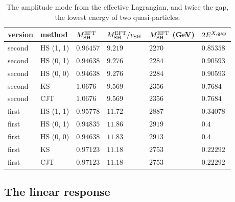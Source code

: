 \documentclass[aps,prd,onecolumn,superscriptaddress,nofootinbib,floatfix,longbibliography]{revtex4-2}
\begin{document}
\begin{table}[!htbp]
\caption{\label{tab:amp}The amplitude mode from the effective Lagrangian, and twice the gap, the lowest energy of two quasi-particles.}
\begingroup\centering\footnotesize\setlength{\tabcolsep}{4pt}
\begin{tabular}{llllll}
\hline\hline
version & method & $M^{\rm EFT}_{\rm SH}$ & $M^{\rm EFT}_{\rm SH}/v_{\rm SH}$ & $M^{\rm EFT}_{\rm SH}$ (GeV) & $2E^{X,{\rm gap}}$ \\ \hline
second & HS (1, 1) & $0.96457$ & $9.219$ & $2270$ & $0.85358$ \\
second & HS (0, 1) & $0.94638$ & $9.276$ & $2284$ & $0.90593$ \\
second & HS (0, 0) & $0.94638$ & $9.276$ & $2284$ & $0.90593$ \\
second & KS & $1.0676$ & $9.569$ & $2356$ & $0.7684$ \\
second & CJT & $1.0676$ & $9.569$ & $2356$ & $0.7684$ \\
first & HS (1, 1) & $0.95778$ & $11.72$ & $2887$ & $0.34078$ \\
first & HS (0, 1) & $0.94835$ & $11.86$ & $2919$ & $0.4$ \\
first & HS (0, 0) & $0.94638$ & $11.83$ & $2913$ & $0.4$ \\
first & KS & $0.97123$ & $11.18$ & $2753$ & $0.22292$ \\
first & CJT & $0.97123$ & $11.18$ & $2753$ & $0.22292$ \\
\hline\hline
\end{tabular}\par
\endgroup
\end{table}

\subsection{The linear response}
\end{document}
